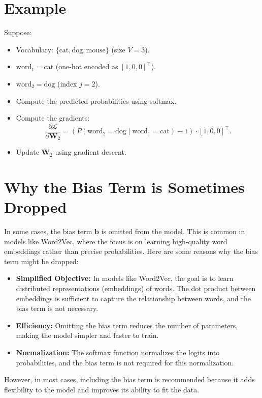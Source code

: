\begin{notechapter}
\section{Example}
Suppose:
\begin{itemize}
    \item Vocabulary: \(\{ \text{cat}, \text{dog}, \text{mouse} \}\) (size \(V = 3\)).
    \item \(\text{word}_1 = \text{cat}\) (one-hot encoded as \([1, 0, 0]^\top\)).
    \item \(\text{word}_2 = \text{dog}\) (index \(j = 2\)).
\end{itemize}

\begin{itemize}
    \item Compute the predicted probabilities using softmax.
    \item Compute the gradients:
          \[
          \frac{\partial \mathcal{L}}{\partial \mathbf{W}_2} =
          \left( P(\text{word}_2 = \text{dog} \mid \text{word}_1 = \text{cat}) - 1 \right)
          \cdot [1, 0, 0]^\top.
          \]
    \item Update \(\mathbf{W}_2\) using gradient descent.
\end{itemize}

\section{Why the Bias Term is Sometimes Dropped}
In some cases, the bias term \(\mathbf{b}\) is omitted from the model. This is
common in models like Word2Vec, where the focus is on learning high-quality
word embeddings rather than precise probabilities. Here are some reasons why
the bias term might be dropped:

\begin{itemize}
    \item \textbf{Simplified Objective:} In models like Word2Vec, the goal is to
          learn distributed representations (embeddings) of words. The dot
          product between embeddings is sufficient to capture the relationship
          between words, and the bias term is not necessary.
    \item \textbf{Efficiency:} Omitting the bias term reduces the number of
          parameters, making the model simpler and faster to train.
    \item \textbf{Normalization:} The softmax function normalizes the logits into
          probabilities, and the bias term is not required for this
          normalization.
\end{itemize}

However, in most cases, including the bias term is recommended because it adds
flexibility to the model and improves its ability to fit the data.
\end{notechapter}
